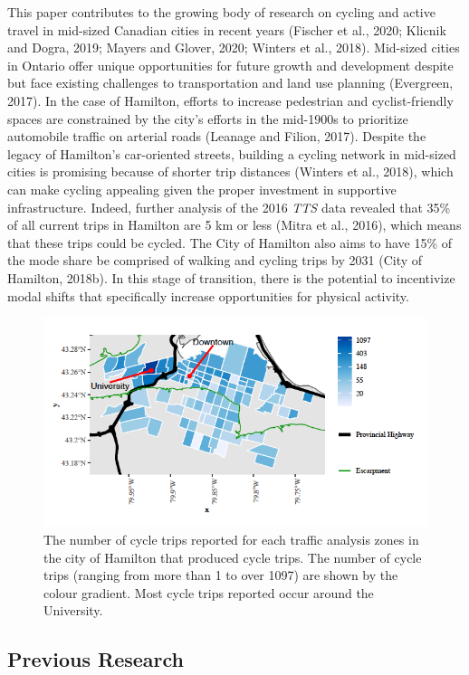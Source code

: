 \documentclass[]{elsarticle} %
\begin{document}
This paper contributes to the growing body of research on cycling and
active travel in mid-sized Canadian cities in recent years (Fischer et
al., 2020; Klicnik and Dogra, 2019; Mayers and Glover, 2020; Winters et
al., 2018). Mid-sized cities in Ontario offer unique opportunities for
future growth and development despite but face existing challenges to
transportation and land use planning (Evergreen, 2017). In the case of
Hamilton, efforts to increase pedestrian and cyclist-friendly spaces are
constrained by the city's efforts in the mid-1900s to prioritize
automobile traffic on arterial roads (Leanage and Filion, 2017). Despite
the legacy of Hamilton's car-oriented streets, building a cycling
network in mid-sized cities is promising because of shorter trip
distances (Winters et al., 2018), which can make cycling appealing given
the proper investment in supportive infrastructure. Indeed, further
analysis of the 2016 \emph{TTS} data revealed that 35\% of all current
trips in Hamilton are 5 km or less (Mitra et al., 2016), which means
that these trips could be cycled. The City of Hamilton also aims to have
15\% of the mode share be comprised of walking and cycling trips by 2031
(City of Hamilton, 2018b). In this stage of transition, there is the
potential to incentivize modal shifts that specifically increase
opportunities for physical activity.

\begin{figure}

{\centering \includegraphics[width=0.65\linewidth]{TAZ-Hamilton} 

}

\caption{The number of cycle trips reported for each traffic analysis zones in the city of Hamilton that produced cycle trips. The number of cycle trips (ranging from more than 1 to over 1097) are shown by the colour gradient. Most cycle trips reported occur around the University.}\label{fig:figure-1}
\end{figure}

\hypertarget{previous-research}{%
\subsection{Previous Research}\label{previous-research}}
\end{document}
